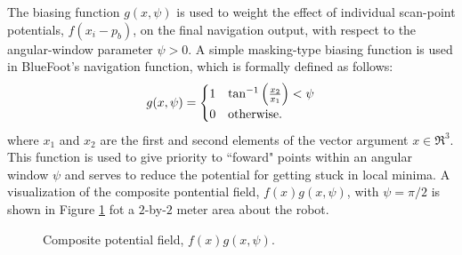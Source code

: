 The biasing function $g(x,\psi)$ is used to weight the effect of individual scan-point potentials, $f(x_{i}-p_{b})$, on the final navigation output, with respect to the angular-window parameter $\psi>0$. A simple masking-type biasing function is used in BlueFoot's navigation function, which is formally defined as follows:
	\begin{equation}
		g(x,\psi) = 
		\begin{cases}
		1	& \tan^{-1}\left( \frac{x_{2}}{x_{1}} \right) < \psi \\
		0 	& \text{otherwise}.
		\end{cases}
	\end{equation}
where $x_{1}$ and $x_{2}$ are the first and second elements of the vector argument $x\in\Re^{3}$. This function is used to give priority to ``foward" points within an angular window $\psi$ and serves to reduce the potential for getting stuck in local minima. A visualization of  the composite pontential field, $f(x)g(x,\psi)$, with $\psi=\pi/2$ is shown in Figure \ref{fig::potential_field} fot a $2$-by-$2$ meter area about the robot.
				\begin{figure}[t!]
					\centering
					\caption{Composite potential field, $f(x)g(x,\psi)$.}
					\label{fig::potential_field}
				\end{figure}

